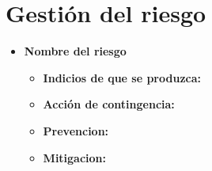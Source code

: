 \documentclass[spanish,a4paper,12pt]{report}	%
\begin{document}
\part{Gestión del riesgo}
\begin{itemize}
\item \textbf{Nombre del riesgo}			%
	\begin{itemize}
		\item \textbf {Indicios de que se produzca: }
		\item \textbf {Acción de contingencia: }
		\item \textbf {Prevencion: }
		\item \textbf {Mitigacion: }
	\end{itemize}
\end{itemize}


\newpage
\mbox{}
\thispagestyle{empty}						%
\newpage
\end{document}
